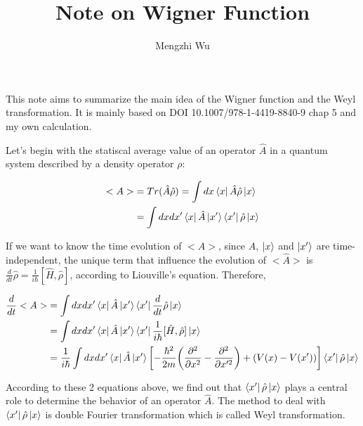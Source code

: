\documentclass{article}
\title{Note on Wigner Function}
\author{Mengzhi Wu}
\begin{document}
    \maketitle    

    This note aims to summarize the main idea of the Wigner function and the Weyl transformation. It is mainly based on DOI 10.1007/978-1-4419-8840-9 chap 5 and my own calculation.
    
    Let's begin with the statiscal average value of an operator $\hat{A}$ in a quantum system described by a density operator $\rho$:

    \begin{equation}
        \begin{split}
            <A> &= Tr(\hat{A}\hat{\rho}) = \int dx \bra{x}\hat{A}\hat{\rho}\ket{x} \\
                &= \int dxdx' \bra{x}\hat{A}\ket{x'}\bra{x'}\hat{\rho}\ket{x}
        \end{split}
    \end{equation}

    If we want to know the time evolution of $<\hat{A}>$, since $\hat{A}$, $\ket{x}$ and $\ket{x'}$ are time-independent, the unique term that influence the evolution of $<\hat{A}>$ is $\frac{d}{dt}\hat{\rho} = \frac{1}{i\hbar}[\hat{H},\hat{\rho}]$, according to Liouville's equation. Therefore, 

    \begin{equation}
        \begin{split}
            \frac{d}{dt} <A> &= \int dxdx' \bra{x}\hat{A}\ket{x'}\bra{x'}\frac{d}{dt}\hat{\rho}\ket{x} \\
                &= \int dxdx' \bra{x}\hat{A}\ket{x'}\bra{x'} \frac{1}{i\hbar}[\hat{H},\hat{\rho}]\ket{x} \\
                &= \frac{1}{i\hbar} \int dxdx' \bra{x}\hat{A}\ket{x'} \biggl[-\frac{\hbar^2}{2m}\biggl(\frac{\partial^2}{\partial x^2}-\frac{\partial^2}{\partial x'^2}\biggr)+(V(x)-V(x'))\biggr] \bra{x'}\hat{\rho}\ket{x}
        \end{split}
    \end{equation}

    According to these 2 equations above, we find out that $\bra{x'}\hat{\rho}\ket{x}$ plays a central role to determine the behavior of an operator $\hat{A}$. The method to deal with $\bra{x'}\hat{\rho}\ket{x}$ is double Fourier transformation which is called Weyl transformation.
\end{document}
